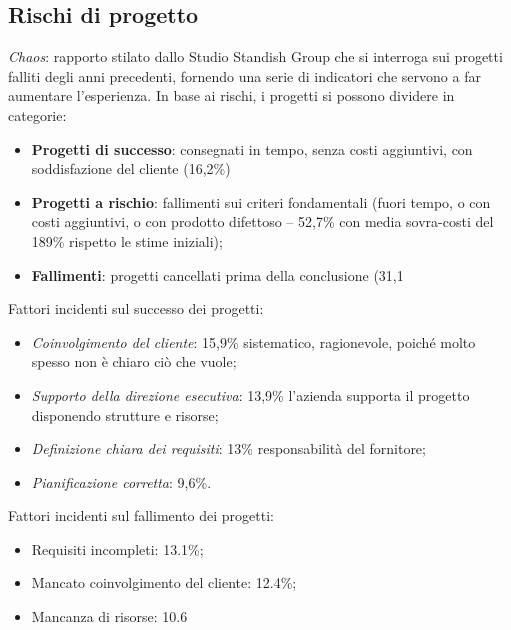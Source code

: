 \subsection{Rischi di progetto}
\textit{Chaos}: rapporto stilato dallo Studio Standish Group che si interroga sui progetti falliti degli anni precedenti, fornendo una serie di indicatori che servono a far aumentare l'esperienza.
In base ai rischi, i progetti si possono dividere in categorie:
\begin{itemize}
\item \textbf{Progetti di successo}: consegnati in tempo, senza costi aggiuntivi, con soddisfazione del cliente (16,2\%)
\item \textbf{Progetti a rischio}: fallimenti sui criteri fondamentali (fuori tempo, o con costi aggiuntivi, o con prodotto difettoso – 52,7\% con media sovra-costi del 189\% rispetto le stime iniziali);
\item \textbf{Fallimenti}: progetti cancellati prima della conclusione (31,1%
\end{itemize}
Fattori incidenti sul successo dei progetti:
\begin{itemize}
\item \textit{Coinvolgimento del cliente}: 15,9\% sistematico, ragionevole, poiché molto spesso non è chiaro ciò che vuole; 
\item \textit{Supporto della direzione esecutiva}: 13,9\% l'azienda supporta il progetto disponendo strutture e risorse; 
\item \textit{Definizione chiara dei requisiti}: 13\% responsabilità del fornitore; 
\item \textit{Pianificazione corretta}: 9,6\%.
\end{itemize}
Fattori incidenti sul fallimento dei progetti:
\begin{itemize}
\item Requisiti incompleti: 13.1\%;
\item Mancato coinvolgimento del cliente: 12.4\%; 
\item Mancanza di risorse: 10.6%
\end{itemize}